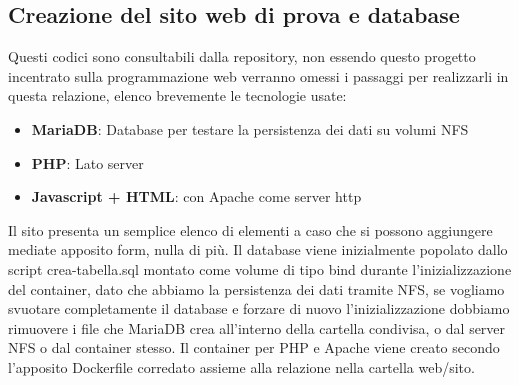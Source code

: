 \documentclass[a4paper]{article}
\begin{document}
\subsection{Creazione del sito web di prova e database}
Questi codici sono consultabili dalla repository, non essendo questo progetto incentrato sulla programmazione
web verranno omessi i passaggi per realizzarli in questa relazione, elenco brevemente le tecnologie usate:
\begin{itemize}
    \item \textbf{MariaDB}: Database per testare la persistenza dei dati su volumi NFS
    \item \textbf{PHP}: Lato server
    \item \textbf{Javascript + HTML}: con Apache come server http
\end{itemize}
Il sito presenta un semplice elenco di elementi a caso che si possono aggiungere mediate apposito form, nulla di più.
Il database viene inizialmente popolato dallo script crea-tabella.sql montato come volume di tipo bind durante l'inizializzazione
del container, dato che abbiamo la persistenza dei dati tramite NFS, se vogliamo svuotare completamente il database e forzare di nuovo
l'inizializzazione dobbiamo rimuovere i file che MariaDB crea all'interno della cartella condivisa, o dal server NFS o dal container stesso.
Il container per PHP e Apache viene creato secondo l'apposito Dockerfile corredato assieme alla relazione nella cartella web/sito.
\end{document}
